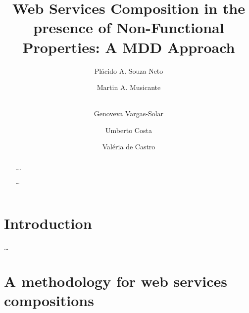 \documentclass[runningheads,a4paper]{llncs}
\newcommand{\keywords}[1]{\par\addvspace\baselineskip
\noindent\keywordname\enspace\ignorespaces#1}
\begin{document}
\mainmatter  %

\title{Web Services Composition in the presence of Non-Functional Properties: A
MDD Approach}


%
%
\author{Pl\'acido A. Souza Neto \and Martin A. Musicante \and\\%
%
 Genoveva Vargas-Solar\and Umberto Costa\and Val\'eria de Castro\\}
%

\institute{\ldots\\
\mailsa\\
\mailsb\\
\mailsc}

%
%

\maketitle


\begin{abstract}
\ldots.
\keywords{\ldots}
\end{abstract}
 

\section{Introduction}
\ldots
 
\section{A methodology for web services com\-po\-si\-tions}
\end{document}
